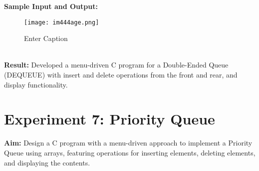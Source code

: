 \documentclass{article}
\begin{document}
\textbf{Sample Input and Output:}
\begin{figure}[h]
    \centering
    \texttt{[image: im444age.png]}
    \caption{Enter Caption}
    \label{fig:enter-label}
\end{figure}
\\
\textbf{Result:} Developed a menu-driven C program for a Double-Ended Queue (DEQUEUE) with insert and delete operations from the front and rear, and display functionality.

\clearpage
\section{Experiment 7: Priority Queue}
\textbf{Aim:} Design a C program with a menu-driven approach to implement a Priority Queue using arrays, featuring operations for inserting elements, deleting elements, and displaying the contents.
\end{document}
